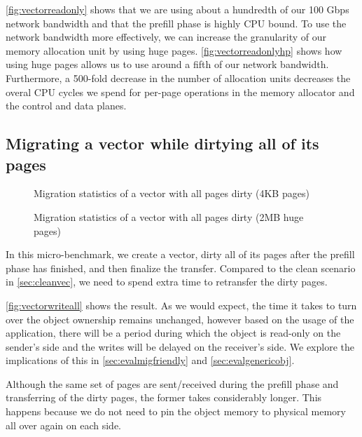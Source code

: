 \autoref{fig:vectorreadonly} shows that we are using about a hundredth of our 100 Gbps
network bandwidth and that the prefill phase is highly CPU bound. To use the
network bandwidth more effectively, we can increase the granularity of our
memory allocation unit by using huge pages. \autoref{fig:vectorreadonlyhp} shows
how using huge pages allows us to use around a fifth of our network bandwidth.
Furthermore, a 500-fold decrease in the number of allocation units decreases
the overal CPU cycles we spend for per-page operations in the memory allocator
and the control and data planes.

\subsection{Migrating a vector while dirtying all of its pages}
\label{sec:dirtyvector}
\begin{figure}[tp]
    \begin{center}
        
    \end{center}
    \caption{Migration statistics of a vector with all pages dirty (4KB pages)}
    \label{fig:vectorwriteall}
\end{figure}

\begin{figure}[tp]
    \begin{center}
        
    \end{center}
    \caption{Migration statistics of a vector with all pages dirty (2MB huge pages)}
    \label{fig:vectorwriteallhp}
\end{figure}

In this micro-benchmark, we create a vector, dirty all of its pages after the
prefill phase has finished, and then finalize the transfer. Compared to the
clean scenario in \autoref{sec:cleanvec}, we need to spend extra time to
retransfer the dirty pages.

\autoref{fig:vectorwriteall} shows the result. As we would expect, the time it takes to turn over
the object ownership remains unchanged, however based on the usage of the
application, there will be a period during which the object is read-only on the
sender's side and the writes will be delayed on the receiver's side. We
explore the implications of this in \autoref{sec:evalmigfriendly} and
\autoref{sec:evalgenericobj}.

Although the same set of pages are sent/received during the prefill phase and
transferring of the dirty pages, the former takes considerably longer. This
happens because we do not need to pin the object memory to physical memory all
over again on each side.


